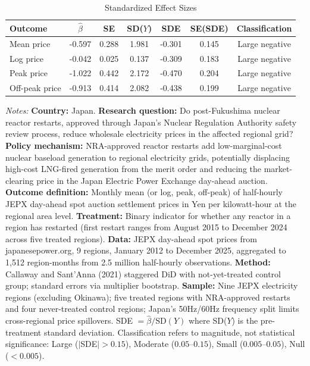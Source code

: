 \begin{table}[t]
\centering
\caption{Standardized Effect Sizes}
\label{tab:sde}
\begin{tabular}{lcccccc}
\hline\hline
Outcome & $\hat{\beta}$ & SE & SD($Y$) & SDE & SE(SDE) & Classification \\
\hline
Mean price & -0.597 & 0.288 & 1.981 & -0.301 & 0.145 & Large negative \\
Log price & -0.042 & 0.025 & 0.137 & -0.309 & 0.183 & Large negative \\
Peak price & -1.022 & 0.442 & 2.172 & -0.470 & 0.204 & Large negative \\
Off-peak price & -0.913 & 0.414 & 2.082 & -0.438 & 0.199 & Large negative \\
\hline\hline
\end{tabular}
\begin{tablenotes}
\item \textit{Notes:} \textbf{Country:} Japan. \textbf{Research question:} Do post-Fukushima nuclear reactor restarts, approved through Japan's Nuclear Regulation Authority safety review process, reduce wholesale electricity prices in the affected regional grid? \textbf{Policy mechanism:} NRA-approved reactor restarts add low-marginal-cost nuclear baseload generation to regional electricity grids, potentially displacing high-cost LNG-fired generation from the merit order and reducing the market-clearing price in the Japan Electric Power Exchange day-ahead auction. \textbf{Outcome definition:} Monthly mean (or log, peak, off-peak) of half-hourly JEPX day-ahead spot auction settlement prices in Yen per kilowatt-hour at the regional area level. \textbf{Treatment:} Binary indicator for whether any reactor in a region has restarted (first restart ranges from August 2015 to December 2024 across five treated regions). \textbf{Data:} JEPX day-ahead spot prices from japanesepower.org, 9 regions, January 2012 to December 2025, aggregated to 1,512 region-months from 2.5 million half-hourly observations. \textbf{Method:} Callaway and Sant'Anna (2021) staggered DiD with not-yet-treated control group; standard errors via multiplier bootstrap. \textbf{Sample:} Nine JEPX electricity regions (excluding Okinawa); five treated regions with NRA-approved restarts and four never-treated control regions; Japan's 50Hz/60Hz frequency split limits cross-regional price spillovers. SDE $= \hat{\beta} / \text{SD}(Y)$ where SD($Y$) is the pre-treatment standard deviation. Classification refers to magnitude, not statistical significance: Large ($|$SDE$| > 0.15$), Moderate ($0.05$--$0.15$), Small ($0.005$--$0.05$), Null ($< 0.005$).
\end{tablenotes}
\end{table}

